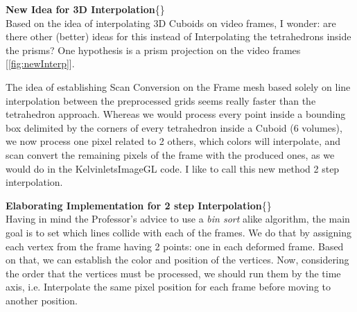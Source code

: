 \documentclass[12pt, a4paper]{report}
\newenvironment{loggentry}[2]%
{\noindent\textbf{#2}\newline\{\marginnote{#1}\}\newline\\}{\vspace{1.0cm}}
\begin{document}
\begin{loggentry}{28-05-2019}{New Idea for 3D Interpolation}
	Based on the idea of interpolating 3D Cuboids on video frames, I wonder: are there other (better) ideas for this instead of Interpolating the tetrahedrons inside the prisms? One hypothesis is a prism projection on the video frames [\ref{fig:newInterp}].	

	The idea of establishing Scan Conversion on the Frame mesh based solely on line interpolation between the preprocessed grids seems really faster than the tetrahedron approach. Whereas we would process every point inside a bounding box delimited by the corners of every tetrahedron inside a Cuboid (6 volumes), we now process one pixel related to 2 others, which colors will interpolate, and scan convert the remaining pixels of the frame with the produced ones, as we would do in the KelvinletsImageGL code. I like to call this new method 2 step interpolation.  
\end{loggentry}

\begin{loggentry}{30-05-2019}{Elaborating Implementation for 2 step Interpolation}
		Having in mind the Professor's advice to use a \textit{bin sort} alike algorithm, the main goal is to set which lines collide with each of the frames. We do that by assigning each vertex from the frame having 2 points: one in each deformed frame. Based on that, we can establish the color and position of the vertices. Now, considering the order that the vertices must be processed, we should run them by the time axis, i.e. Interpolate the same pixel position for each frame before moving to another position.    
\end{loggentry}
\end{document}
